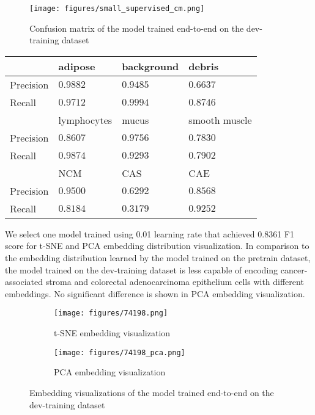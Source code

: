 \documentclass[12pt,twoside]{report}
\begin{document}
\begin{figure}
    \centering
    \texttt{[image: figures/small\_supervised\_cm.png]}
    \caption{Confusion matrix of the model trained end-to-end on the dev-training dataset}
    \label{fig:small_supervised_cm}
\end{figure}

\begin{table}[]
    \centering
    \begin{tabular}{llll}
\toprule
 & adipose & background & debris \\
\hline
Precision & $0.9882$ & $0.9485$ & $0.6637$ \\
Recall & $0.9712$ & $0.9994$ & $0.8746$ \\
\toprule
 & lymphocytes & mucus & smooth muscle \\
\hline
Precision & $0.8607$ & $0.9756$ & $0.7830$ \\
Recall & $0.9874$ & $0.9293$ & $0.7902$ \\
\toprule
 & NCM & CAS & CAE \\
\hline
Precision & $0.9500$ & $0.6292$ & $0.8568$ \\
Recall & $0.8184$ & $0.3179$ & $0.9252$ \\
    \bottomrule
    \end{tabular}
    \captionsetup{type=table}
    \label{tab:small_supervised_preci_recall}
\end{table}

We select one model trained using 0.01 learning rate that achieved 0.8361 F1 score for t-SNE and PCA embedding distribution visualization. In comparison to the embedding distribution learned by the model trained on the pretrain dataset, the model trained on the dev-training dataset is less capable of encoding cancer-associated stroma and colorectal adenocarcinoma epithelium cells with different embeddings. No significant difference is shown in PCA embedding visualization. \\

\begin{figure}
\centering
    \begin{subfigure}{.45\textwidth}
      \centering
      \texttt{[image: figures/74198.png]}
      \caption{t-SNE embedding visualization}
      \label{fig:small_supervised_tsne}
    \end{subfigure}%
    \begin{subfigure}{.45\textwidth}
      \centering
      \texttt{[image: figures/74198\_pca.png]}
      \caption{PCA embedding visualization}
      \label{fig:small_supervised_pca}
    \end{subfigure}
    \caption{Embedding visualizations of the model trained end-to-end on the dev-training dataset}
    \label{fig:small_supervised_embedding}
\end{figure}
\end{document}
